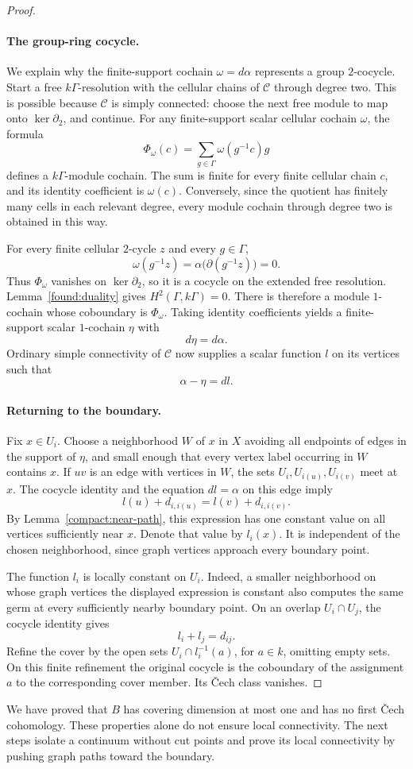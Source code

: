 \begin{proof}
\paragraph{The group-ring cocycle.}
We explain why the finite-support cochain $\omega=d\alpha$ represents
a group $2$-cocycle.  Start a free $k\Gamma$-resolution with the cellular
chains of $\mathcal C$ through degree two.  This is possible because
$\mathcal C$ is simply connected: choose the next free module to map
onto $\ker\partial_2$, and continue.  For any finite-support scalar
cellular cochain $\omega$, the formula
\[
 \Phi_\omega(c)=\sum_{g\in\Gamma}\omega(g^{-1}c)g
\]
defines a $k\Gamma$-module cochain.  The sum is finite for every finite
cellular chain $c$, and its identity coefficient is $\omega(c)$.
Conversely, since the quotient has finitely many cells in each relevant
degree, every module cochain through degree two is obtained in this way.

For every finite cellular $2$-cycle $z$ and every $g\in\Gamma$,
\[
 \omega(g^{-1}z)=\alpha\bigl(\partial(g^{-1}z)\bigr)=0.
\]
Thus $\Phi_\omega$ vanishes on $\ker\partial_2$, so it is a cocycle on
the extended free resolution.  Lemma~\ref{found:duality} gives
$H^2(\Gamma,k\Gamma)=0$.  There is therefore a module $1$-cochain whose
coboundary is $\Phi_\omega$.  Taking identity coefficients yields a
finite-support scalar $1$-cochain $\eta$ with
\[
 d\eta=d\alpha.
\]
Ordinary simple connectivity of $\mathcal C$ now supplies a scalar
function $l$ on its vertices such that
\[
 \alpha-\eta=dl.
\]

\paragraph{Returning to the boundary.}
Fix $x\in U_i$.  Choose a neighborhood $W$ of $x$ in $X$ avoiding all
endpoints of edges in the support of $\eta$, and small enough that every
vertex label occurring in $W$ contains $x$.  If $uv$ is an edge with
vertices in $W$, the sets $U_i,U_{i(u)},U_{i(v)}$ meet at $x$.
The cocycle identity and the equation $dl=\alpha$ on this edge imply
\[
 l(u)+d_{i,i(u)}=l(v)+d_{i,i(v)}.
\]
By Lemma~\ref{compact:near-path}, this expression has one constant value
on all vertices sufficiently near $x$.  Denote that value by $l_i(x)$.
It is independent of the chosen neighborhood, since graph vertices
approach every boundary point.

The function $l_i$ is locally constant on $U_i$.  Indeed, a smaller
neighborhood on whose graph vertices the displayed expression is
constant also computes the same germ at every sufficiently nearby
boundary point.  On an overlap $U_i\cap U_j$, the cocycle identity gives
\[
 l_i+l_j=d_{ij}.
\]
Refine the cover by the open sets
$U_i\cap l_i^{-1}(a)$, for $a\in k$, omitting empty sets.  On this finite
refinement the original cocycle is the coboundary of the assignment $a$
to the corresponding cover member.  Its \v{C}ech class vanishes.
\end{proof}

We have proved that $B$ has covering dimension at most one and
has no first \v{C}ech cohomology.  These properties alone do not ensure
local connectivity.  The next steps isolate a continuum without cut
points and prove its local connectivity by pushing graph paths toward
the boundary.
